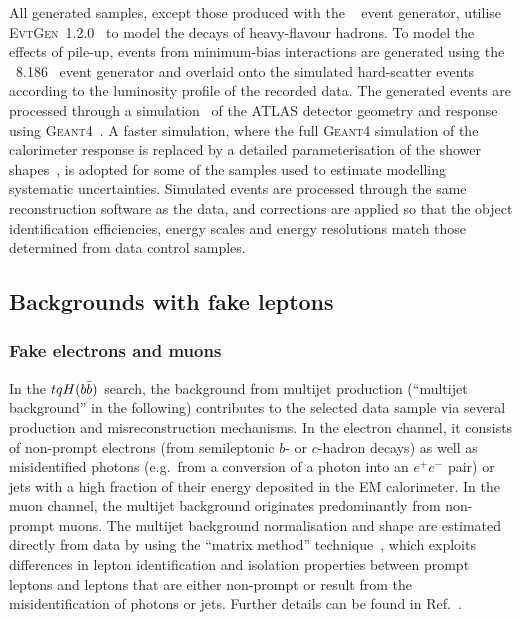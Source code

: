 All generated samples, except those produced with the {\sherpa}~\cite{Gleisberg:2008ta} event generator, 
utilise \textsc{EvtGen}~1.2.0~\cite{Lange:2001uf} to model the decays of heavy-flavour hadrons. 
To model the effects of pile-up, events from minimum-bias interactions are generated using the {\pythia}~8.186~\cite{Sjostrand:2007gs} 
event generator and overlaid onto the simulated hard-scatter events according to the luminosity profile of the recorded data. 
The generated events are processed through a simulation~\cite{Aad:2010ah} of the ATLAS detector geometry and response 
using \textsc{Geant4}~\cite{Agostinelli:2002hh}. A faster simulation, where the full \textsc{Geant4} simulation of
the calorimeter response is replaced by a detailed parameterisation of the shower shapes~\cite{FastCaloSim},
is adopted for some of the samples used to estimate modelling systematic uncertainties.
Simulated events are processed through the same reconstruction software as the data, and corrections are applied so that the object identification 
efficiencies, energy scales and energy resolutions match those determined from data control samples.

\subsection{Backgrounds with fake leptons}
\label{sec:fakeleptons}

\subsubsection{Fake electrons and muons}
In the $tqH(b\bar{b})$ search, the background from multijet production (``multijet background'' in the following) contributes to the selected 
data sample via several production and misreconstruction mechanisms.  
In the electron channel, it consists of non-prompt electrons (from semileptonic $b$- or $c$-hadron decays) as well as 
misidentified photons (e.g.~from a conversion of a photon into an $e^+e^-$ pair) or jets with a high fraction of 
their energy deposited in the EM calorimeter.  In the muon channel, the multijet background originates predominantly from 
non-prompt muons.  The multijet background normalisation and shape are estimated directly from data by using the ``matrix method''
technique~\cite{Aad:2010ey,ATLAS-CONF-2014-058}, which exploits differences in lepton identification and isolation properties between 
prompt leptons and leptons that are either non-prompt or result from the misidentification of photons or jets. 
Further details can be found in Ref.~\cite{Aaboud:2018mjh}.


